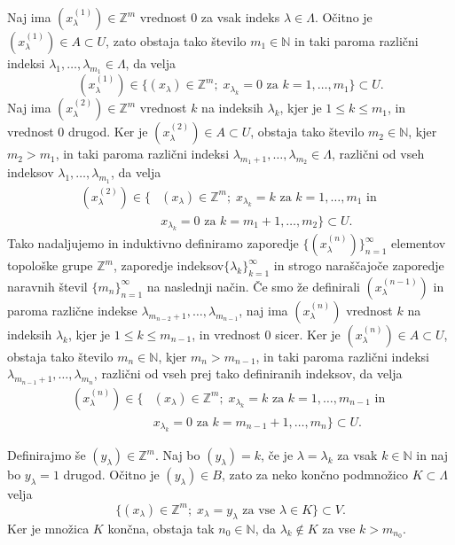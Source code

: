\documentclass[mat1]{fmfdelo}
\newcommand{\N}{\mathbb N}
\newcommand{\Z}{\mathbb Z}
\begin{document}
\begin{dokaz}
Naj ima $(x_\lambda^{(1)}) \in \Z^m$ vrednost $0$ za vsak indeks $\lambda \in \Lambda$. Očitno je $(x_\lambda^{(1)}) \in A \subset U$, zato obstaja tako število $m_1 \in \N$ in taki paroma različni indeksi $\lambda_1,\dots, \lambda_{m_1} \in \Lambda$, da velja
\[ (x_\lambda^{(1)}) \in \lbrace (x_\lambda) \in \Z^m ;\; x_{\lambda_k} = 0 \text{ za } k=1,\dots,m_1\rbrace \subset U. \]
Naj ima $(x_\lambda^{(2)}) \in \Z^m$ vrednost $k$ na indeksih $\lambda_k$, kjer je $1 \leq k \leq m_1$, in vrednost $0$ drugod. Ker je $(x_\lambda^{(2)}) \in A \subset U$, obstaja tako število $m_2 \in \N$, kjer $m_2 > m_1$, in taki paroma različni indeksi $\lambda_{m_1+1},\dots,\lambda_{m_2} \in \Lambda$, različni od vseh indeksov $\lambda_1,\dots, \lambda_{m_1}$, da velja
\begin{align*}
(x_\lambda^{(2)}) \in \lbrace &(x_\lambda) \in \Z^m ;\; x_{\lambda_k} = k \text{ za } k=1,\dots,m_1 \text{ in }\\
& x_{\lambda_k} = 0 \text{ za } k = m_1+1,\dots, m_2\rbrace \subset U.
\end{align*}
Tako nadaljujemo in induktivno definiramo zaporedje $\lbrace (x_\lambda^{(n)}) \rbrace_{n = 1}^\infty$ elementov topološke grupe $\Z^m$, zaporedje indeksov$\lbrace\lambda_k\rbrace_{k = 1}^\infty$ in strogo naraščajoče zaporedje naravnih števil $\lbrace m_n \rbrace_{n = 1}^\infty$ na naslednji način. Če smo že definirali $(x_\lambda^{(n-1)})$ in paroma različne indekse $\lambda_{m_{n-2}+1},\dots, \lambda_{m_{n-1}}$, naj ima $(x_\lambda^{(n)})$ vrednost $k$ na indeksih $\lambda_k$, kjer je $1 \leq k \leq m_{n-1}$, in vrednost $0$ sicer. Ker je $(x_\lambda^{(n)}) \in A \subset U$, obstaja tako število $m_n \in \N$, kjer $m_n > m_{n-1}$, in taki paroma različni indeksi $\lambda_{m_{n-1}+1},\dots,\lambda_{m_n}$, različni od vseh prej tako definiranih indeksov, da velja
\begin{align*}
(x_\lambda^{(n)}) \in \lbrace &(x_\lambda) \in \Z^m ;\; x_{\lambda_k} = k \text{ za } k=1,\dots,m_{n-1} \text{ in }\\
& x_{\lambda_k} = 0 \text{ za } k = m_{n-1}+1,\dots, m_n\rbrace \subset U.
\end{align*}

Definirajmo še $(y_\lambda) \in \Z^m$. Naj bo $(y_\lambda) = k$, če je $\lambda = \lambda_k$ za vsak $k \in \N$ in naj bo $y_\lambda = 1$ drugod. Očitno je $(y_\lambda) \in B$, zato za neko končno podmnožico $K \subset \Lambda$ velja
\[ \lbrace (x_\lambda) \in \Z^m ;\; x_\lambda = y_\lambda \text{ za vse } \lambda \in K \rbrace \subset V. \]
Ker je množica $K$ končna, obstaja tak $n_0 \in \N$, da $\lambda_k \notin K$ za vse $k > m_{n_0}$.


\end{dokaz}
\end{document}
